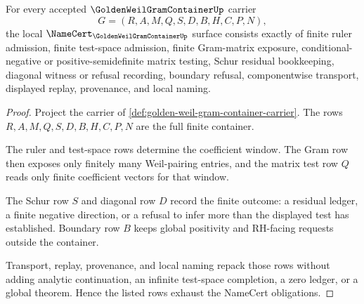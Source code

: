 \begin{theorem}
\label{thm:golden-weil-gram-container-namecert-obligations}
For every accepted $\GoldenWeilGramContainerUp$ carrier
$$
G=(R,A,M,Q,S,D,B,H,C,P,N),
$$
the local $\NameCert_{\GoldenWeilGramContainerUp}$ surface consists exactly of finite ruler admission, finite test-space admission, finite Gram-matrix exposure, conditional-negative or positive-semidefinite matrix testing, Schur residual bookkeeping, diagonal witness or refusal recording, boundary refusal, componentwise transport, displayed replay, provenance, and local naming.
\end{theorem}
\begin{proof}
Project the carrier of \autoref{def:golden-weil-gram-container-carrier}. The rows $R,A,M,Q,S,D,B,H,C,P,N$ are the full finite container.

The ruler and test-space rows determine the coefficient window. The Gram row then exposes only finitely many Weil-pairing entries, and the matrix test row $Q$ reads only finite coefficient vectors for that window.

The Schur row $S$ and diagonal row $D$ record the finite outcome: a residual ledger, a finite negative direction, or a refusal to infer more than the displayed test has established. Boundary row $B$ keeps global positivity and RH-facing requests outside the container.

Transport, replay, provenance, and local naming repack those rows without adding analytic continuation, an infinite test-space completion, a zero ledger, or a global theorem. Hence the listed rows exhaust the NameCert obligations.
\end{proof}

